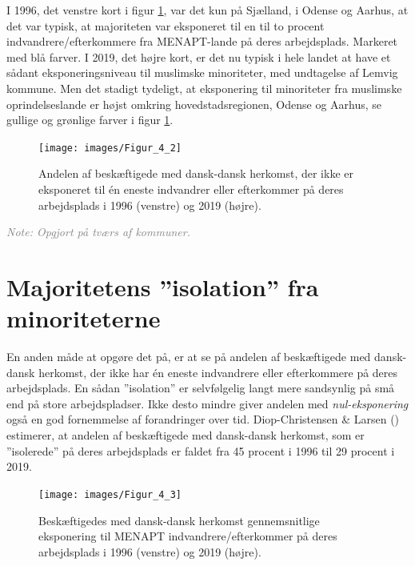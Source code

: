 \documentclass[
]{book}
\begin{document}
I 1996, det venstre kort i figur \ref{fig:fig-5-3}, var det kun på Sjælland, i Odense og Aarhus, at det var typisk, at majoriteten var eksponeret til en til to procent indvandrere/efterkommere fra MENAPT-lande på deres arbejdsplads. Markeret med blå farver. I 2019, det højre kort, er det nu typisk i hele landet at have et sådant eksponeringsniveau til muslimske minoriteter, med undtagelse af Lemvig kommune. Men det stadigt tydeligt, at eksponering til minoriteter fra muslimske oprindelseslande er højst omkring hovedstadsregionen, Odense og Aarhus, se gullige og grønlige farver i figur \ref{fig:fig-5-3}.

\newpage

\begin{figure}
\texttt{[image: images/Figur\_4\_2]} \caption{Andelen af beskæftigede med dansk-dansk herkomst, der ikke er eksponeret til én eneste indvandrer eller efterkommer på deres arbejdsplads i 1996 (venstre) og 2019 (højre).}\label{fig:fig-5-3}
\end{figure}

\begin{footnotesize}\textit{\textcolor{gray}{
Note: Opgjort på tværs af kommuner.
}}
\end{footnotesize}

\section{Majoritetens ''isolation'' fra minoriteterne}\label{majoritetens-isolation-fra-minoriteterne}

En anden måde at opgøre det på, er at se på andelen af beskæftigede med dansk-dansk herkomst, der ikke har én eneste indvandrere eller efterkommere på deres arbejdsplads. En sådan ''isolation'' er selvfølgelig langt mere sandsynlig på små end på store arbejdspladser. Ikke desto mindre giver andelen med \emph{nul-eksponering} også en god fornemmelse af forandringer over tid. Diop-Christensen \& Larsen () estimerer, at andelen af beskæftigede med dansk-dansk herkomst, som er ''isolerede'' på deres arbejdsplads er faldet fra 45 procent i 1996 til 29 procent i 2019.

\newpage

\begin{figure}
\texttt{[image: images/Figur\_4\_3]} \caption{Beskæftigedes med dansk-dansk herkomst gennemsnitlige eksponering til MENAPT indvandrere/efterkommer på deres arbejdsplads i 1996 (venstre) og 2019 (højre).}\label{fig:fig-5-4}
\end{figure}
\end{document}
